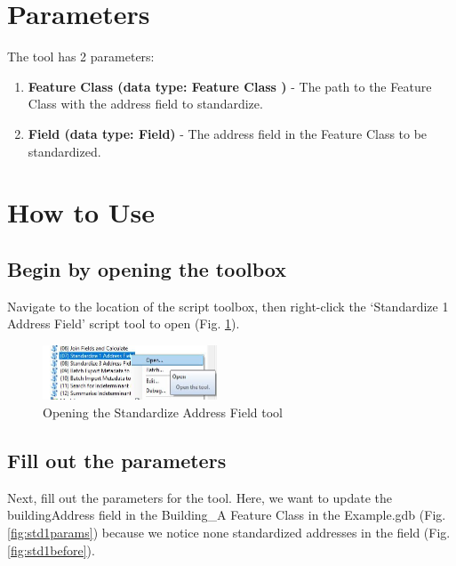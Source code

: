 \documentclass[openany]{book}
\providecommand{\tightlist}{%
  \setlength{\itemsep}{0pt}\setlength{\parskip}{0pt}}
\theoremstyle{definition}
\theoremstyle{definition}
\theoremstyle{definition}
\theoremstyle{remark}
\begin{document}
\section{Parameters}\label{parameters-6}

The tool has 2 parameters:

\begin{enumerate}
\def\labelenumi{\arabic{enumi}.}
\tightlist
\item
  \textbf{Feature Class (data type: Feature Class )} - The path to the
  Feature Class with the address field to standardize.
\item
  \textbf{Field (data type: Field)} - The address field in the Feature
  Class to be standardized.
\end{enumerate}

\section{How to Use}\label{how-to-use-6}

\subsection{Begin by opening the
toolbox}\label{begin-by-opening-the-toolbox-6}

Navigate to the location of the script toolbox, then right-click the
`Standardize 1 Address Field' script tool to open (Fig.
\ref{fig:std1open}).

\begin{figure}[H]

{\centering \includegraphics[width=2.04in,]{figures/std1-opentool} 

}

\caption{Opening the Standardize Address Field tool}\label{fig:std1open}
\end{figure}

\subsection{Fill out the parameters}\label{fill-out-the-parameters-6}

Next, fill out the parameters for the tool. Here, we want to update the
buildingAddress field in the Building\_A Feature Class in the
Example.gdb (Fig. \ref{fig:std1params}) because we notice none
standardized addresses in the field (Fig. \ref{fig:std1before}).
\end{document}
